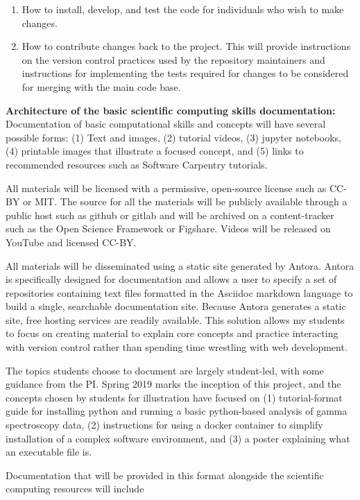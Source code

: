 \begin{enumerate}
    \item How to install, develop, and test the code for individuals who wish to make changes.  
    \item How to contribute changes back to the project.  This will provide instructions on the version control practices used by the repository maintainers and instructions for implementing the tests required for changes to be considered for merging with the main code base.
\end{enumerate}

\textbf{Architecture of the basic scientific computing skills documentation:}  Documentation of basic computational skills and concepts will have several possible forms: (1) Text and images, (2) tutorial videos, (3) jupyter notebooks, (4) printable images that illustrate a focused concept, and (5) links to recommended resources such as Software Carpentry tutorials.

All materials will be licensed with  a permissive, open-source license such as CC-BY or MIT.  The source for all the materials will be publicly available through a public host such as github or gitlab and will be archived on a content-tracker such as the Open Science Framework or Figshare.  Videos will be released on YouTube and licensed CC-BY.

All materials will be disseminated using a static site generated by Antora.  Antora is specifically designed for documentation and allows a user to specify a set of repositories containing text files formatted in the Asciidoc markdown language to build a single, searchable documentation site.  Because Antora generates a static site, free hosting services are readily available.  This solution allows my students to focus on creating material to explain core concepts and practice interacting with version control rather than spending time wrestling with web development.

The topics students choose to document are largely student-led, with some guidance from the PI.  Spring 2019 marks the inception of this project, and the concepts chosen by students for illustration have focused on (1) tutorial-format guide for installing python and running a basic python-based analysis of gamma spectroscopy data, (2) instructions for using a docker container to simplify installation of a complex software environment, and (3) a poster explaining what an executable file is.

Documentation that will be provided in this format alongside the scientific computing resources will include

